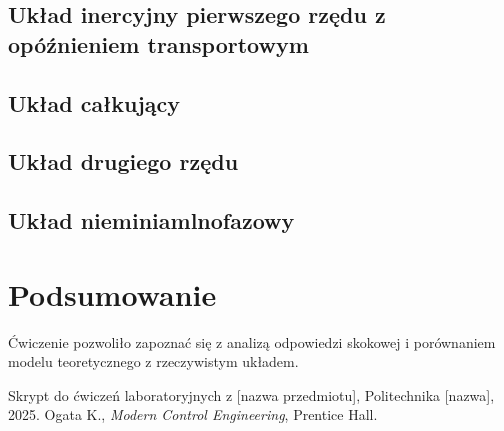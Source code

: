 \documentclass[12pt,a4paper]{article}
\begin{document}
	\subsection{Układ inercyjny pierwszego rzędu z opóźnieniem transportowym}	
	
	\subsection{Układ całkujący}
	
	\subsection{Układ drugiego rzędu}
	
	\subsection{Układ nieminiamlnofazowy}
	
	\section{Podsumowanie}
	Ćwiczenie pozwoliło zapoznać się z analizą odpowiedzi skokowej i porównaniem modelu teoretycznego z rzeczywistym układem.
	
	\begin{thebibliography}{9}
		 Skrypt do ćwiczeń laboratoryjnych z [nazwa przedmiotu], Politechnika [nazwa], 2025.
		 Ogata K., \textit{Modern Control Engineering}, Prentice Hall.
	\end{thebibliography}
	
\end{document}
